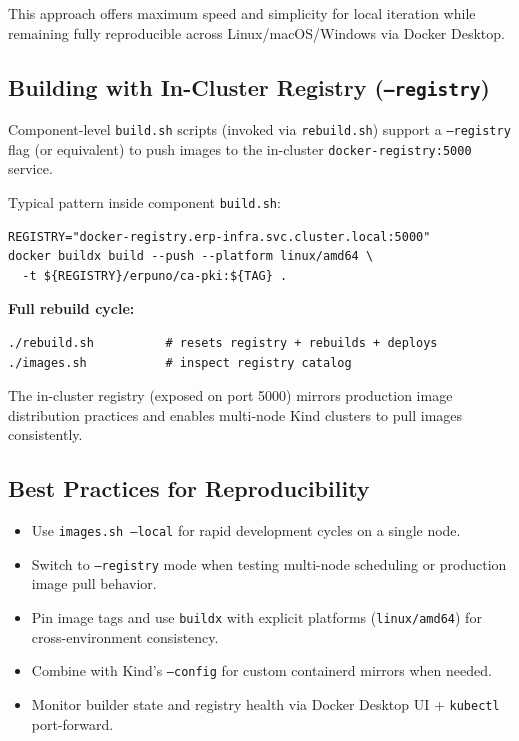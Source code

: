 \documentclass{article}
\begin{document}
This approach offers maximum speed and simplicity for local iteration while remaining
fully reproducible across Linux/macOS/Windows via Docker Desktop.

\subsection{Building with In-Cluster Registry (\texttt{--registry})}

Component-level \texttt{build.sh} scripts (invoked via \texttt{rebuild.sh}) support
a \texttt{--registry} flag (or equivalent) to push images to the in-cluster \texttt{docker-registry:5000} service.

Typical pattern inside component \texttt{build.sh}:

\begin{verbatim}
REGISTRY="docker-registry.erp-infra.svc.cluster.local:5000"
docker buildx build --push --platform linux/amd64 \
  -t ${REGISTRY}/erpuno/ca-pki:${TAG} .
\end{verbatim}

\textbf{Full rebuild cycle:}
\begin{verbatim}
./rebuild.sh          # resets registry + rebuilds + deploys
./images.sh           # inspect registry catalog
\end{verbatim}

The in-cluster registry (exposed on port 5000) mirrors production image distribution
practices and enables multi-node Kind clusters to pull images consistently.

\subsection{Best Practices for Reproducibility}

\begin{itemize}
\item Use \texttt{images.sh --local} for rapid development cycles on a single node.
\item Switch to \texttt{--registry} mode when testing multi-node scheduling or production image pull behavior.
\item Pin image tags and use \texttt{buildx} with explicit platforms (\texttt{linux/amd64}) for cross-environment consistency.
\item Combine with Kind's \texttt{--config} for custom containerd mirrors when needed.
\item Monitor builder state and registry health via Docker Desktop UI + \texttt{kubectl} port-forward.
\end{itemize}
\end{document}
